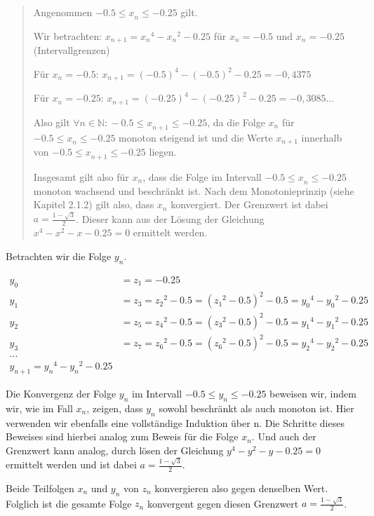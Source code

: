 \documentclass[a4paper, 12pt]{book}
\begin{document}
\begin{itemize}
\begin{itemize}
\begin{enumerate}
\begin{quote}
Angenommen \(- 0.5{\leq x}_{n} \leq  - 0.25\) gilt.

Wir betrachten:
\(x_{n + 1} = {x_{n}}^{4} - {x_{n}}^{2} - 0.25\) für
\(x_{n} =  - 0.5\) und \(x_{n} =  - 0.25\) (Intervallgrenzen)

Für \(x_{n} =  - 0.5\):
\(x_{n + 1} = {( - 0.5)}^{4} - {( - 0.5)}^{2} - 0.25 =  - 0,4375\)

Für \(x_{n} =  - 0.25\):
\(x_{n + 1} = {( - 0.25)}^{4} - {( - 0.25)}^{2} - 0.25 =  - 0,3085...\)

Also gilt
\(\forall n \in \mathbb{N:} - 0.5{\leq x}_{n + 1} \leq  - 0.25\),
da die Folge \(x_{n}\) für
\(- 0.5{\leq x}_{n} \leq  - 0.25\) monoton steigend ist und
die Werte \({x}_{n + 1}\) innerhalb von
\(- 0.5{\leq x}_{n + 1} \leq  - 0.25\) liegen.

Insgesamt gilt also für \(x_{n}\), dass die Folge im Intervall
\(- 0.5{\leq x}_{n} \leq  - 0.25\) monoton wachsend und
beschränkt ist. Nach dem Monotonieprinzip (siehe Kapitel 2.1.2) gilt
also, dass \(x_{n}\) konvergiert. Der Grenzwert ist dabei
\(a = \frac{1 - \sqrt{3}}{2}\). Dieser kann aus der Lösung der
Gleichung \(x^{4} - x^{2} - x - 0.25 = 0\) ermittelt
werden.
\end{quote}

Betrachten wir die Folge \(y_{n}\).

\begin{align*}
y_{0} &= z_{1} =  - 0.25\\
y_{1} &= z_{3} = {z_{2}}^{2} - 0.5 = ({z_{1}}^{2} - 0.5)^{2} - 0.5 = {y_{0}}^{4} - {y_{0}}^{2} - 0.25\\
y_{2} &= z_{5} = {z_{4}}^{2} - 0.5 = ({z_{3}}^{2} - 0.5)^{2} - 0.5 = {y_{1}}^{4} - {y_{1}}^{2} - 0.25\\
y_{3} &= z_{7} = {z_{6}}^{2} - 0.5 = ({z_{6}}^{2} - 0.5)^{2} - 0.5 = {y_{2}}^{4} - {y_{2}}^{2} - 0.25\\
...\\
y_{n + 1} = {y_{n}}^{4} - {y_{n}}^{2} - 0.25
\end{align*}

Die Konvergenz der Folge \(y_{n}\) im Intervall
\(- 0.5{\leq y}_{n} \leq  - 0.25\) beweisen wir, indem wir,
wie im Fall \(x_{n}\), zeigen, dass \(y_{n}\) sowohl beschränkt als auch
monoton ist. Hier verwenden wir ebenfalls eine vollständige Induktion
über n. Die Schritte dieses Beweises sind hierbei analog zum Beweis für
die Folge \(x_{n}\). Und auch der Grenzwert kann analog, durch lösen der
Gleichung \(y^{4} - y^{2} - y - 0.25 = 0\) ermittelt
werden und ist dabei \(a = \frac{1 - \sqrt{3}}{2}\).

Beide Teilfolgen \(x_{n}\) und \(y_{n}\) von \(z_{n}\) konvergieren also
gegen denselben Wert. Folglich ist die gesamte Folge \(z_{n}\)
konvergent gegen diesen Grenzwert \(a = \frac{1 - \sqrt{3}}{2}\).
\end{enumerate}
\end{itemize}
\end{itemize}
\end{document}
